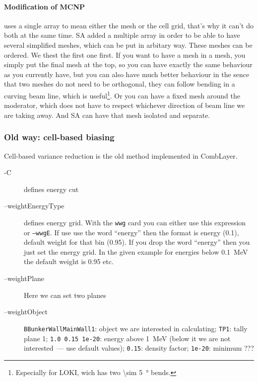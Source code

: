 \paragraph{Modification of MCNP}
\mcnp uses a single array to mean either the mesh or the cell grid, that's why it can't do both at the same time.
SA added a multiple array in order to be able to have several simplified meshes, which can be put in arbitary way.
These meshes can be ordered.
We thest the first one first. If you want to have a mesh in a mesh, you simply put the final mesh at the top,
so you can have exactly the same behaviour as you currently have, but you can also have much better behaviour in the sence
that two meshes do not need to be orthogonal, they can follow bending in a curving beam line, which is useful\footnote{Especially for LOKI, wich has two \SI{\sim 5}{\degree} bends.}.
Or you can have a fixed mesh around the moderator, which does not have to respect whichever direction of beam line we are taking away.
And SA can have that mesh isolated and separate.

\subsubsection{Old way: cell-based biasing}
\label{sec:vr:cadis:cell}
Cell-based variance reduction is the old method implemented in CombLayer.



\begin{description}
\item[-C] defines energy cut
\item[--weightEnergyType] defines energy grid. With the {\tt wwg} card you can either use this expression or {\tt --wwgE}.
  If use use the word ``energy'' then the format is energy (0.1), default weight for that bin (0.95). If you drop the word ``energy'' then you just set the energy grid.
  In the given example for energies below \SI{0.1}{\mega\electronvolt} the default weight is 0.95 etc.
\item[--weightPlane] Here we can set two planes
\item[--weightObject] {\tt BBunkerWallMainWall1}: object we are interested in calculating; {\tt TP1}: tally plane 1;
  \mbox{\tt 1.0 0.15 1e-20}: energy above \SI{1}{\mega\electronvolt} (below it we are not interested~--- use default values);
  {\tt 0.15}: density factor; {\tt 1e-20}: minimum \alert{???} %

\end{description}

